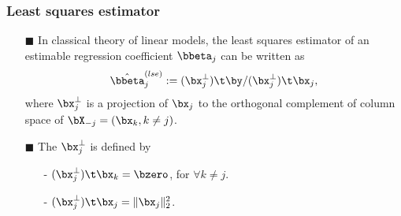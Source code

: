 \begin{frame}
\frametitle{Least squares estimator}
\begin{itemize}

\item[$\blacksquare$] In classical theory of linear models, the least squares estimator of an estimable regression coefficient $\bbeta_{j}$ can be written as  %
\begin{equation}
\hat{\bbeta}^{(lse)}_{j} := (\bx^{\bot}_{j})\t \by /(\bx^{\bot}_{j})\t \bx_{j},
\end{equation}
where $\bx^{\bot}_{j}$ is a projection of $\bx_{j}$ to the orthogonal complement of column space of $\bX_{-j}=(\bx_{k},k\neq j)$.

\item[$\blacksquare$] The $\bx^{\perp}_{j}$ is defined by
\begin{itemize}
      \item[-] $(\bx^{\bot}_{j})\t \bx_{k}=\bzero $, for $ \forall k\neq j$.
      \medskip
      \item[-] $(\bx^{\bot}_{j})\t \bx_{j}=\|\bx_{j}\|^{2}_{2}$.

\vspace{3mm}

\end{itemize}

\end{itemize}


\end{frame}


